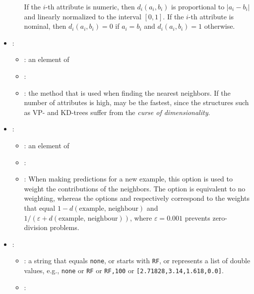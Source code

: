 \begin{itemize}
\begin{itemize}
        If the $i$-th attribute is numeric, then $d_i(a_i, b_i)$ is proportional to $|a_i - b_i|$ and linearly normalized to the interval $[0, 1]$.
        If the $i$-th attribute is nominal, then $d_i(a_i, b_i) = 0$ if $a_i = b_i$ and  $d_i(a_i, b_i) = 1$ otherwise.
    \end{itemize}
    \item {}:
    \begin{itemize}
        \item \optionPossibleValues{}: an element of
        \item \optionDefaultValue{}: 
        \item \optionDescrption{}: the method that is used when finding the nearest neighbors. If the number of attributes is high, 
        may be the fastest, since the structures such as VP- and KD-trees suffer from the \emph{curse of dimensionality}.
    \end{itemize}
    \item {}:
    \begin{itemize}
        \item \optionPossibleValues{}: an element of 
        \item \optionDefaultValue{}: 
        \item \optionDescrption{}: When making predictions for a new example, this option is used to weight the contributions of the neighbors. The option 
        is equivalent to no weighting, whereas the options  and  respectively correspond to the weights that equal
        $1 - d(\text{example, neighbour})$ and $1 / (\varepsilon + d(\text{example, neighbour}))$, where $\varepsilon = 0.001$ prevents zero-division
        problems.
    \end{itemize}
    \item {}:
    \begin{itemize}
        \item \optionPossibleValues{}: a string that equals {\tt none}, or starts with {\tt RF}, or represents a list of double values, e.g.,
        {\tt none} or {\tt RF} or {\tt RF,100} or {\tt [2.71828,3.14,1.618,0.0]}.
        \item \optionDefaultValue{}: 

\end{itemize}
\end{itemize}
